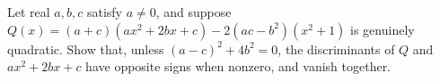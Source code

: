 Let real $a,b,c$ satisfy $a\ne0$, and suppose $Q(x)=(a+c)(ax^2+2bx+c)-2(ac-b^2)(x^2+1)$ is genuinely quadratic. Show that, unless $(a-c)^2+4b^2=0$, the discriminants of $Q$ and $ax^2+2bx+c$ have opposite signs when nonzero, and vanish together.
